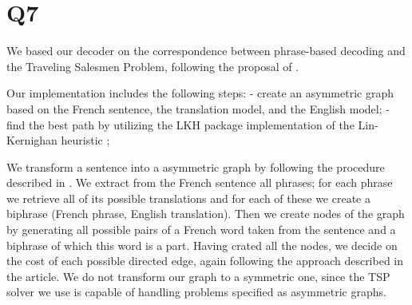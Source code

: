 \documentclass[11pt]{article}
\begin{document}
\section*{Q7}
We based our decoder on the correspondence between phrase-based decoding and the Traveling Salesmen Problem, following the proposal of \cite{zaslavskiy2009}.

Our implementation includes the following steps:
- create an asymmetric graph based on the French sentence, the translation model, and the English model;
- find the best path by utilizing the LKH package implementation of the Lin-Kernighan heuristic \cite{Helsgaun2006};

We transform a sentence into a asymmetric graph by following the procedure described in \cite{zaslavskiy2009}. We extract from the French sentence all phrases; for each phrase we retrieve all of its possible translations and for each of these we create a biphrase (French phrase, English translation). Then we create nodes of the graph by generating all possible pairs of a French word taken from the sentence and a biphrase of which this word is a part. Having crated all the nodes, we decide on the cost of each possible directed edge, again following the approach described in the article. We do not transform our graph to a symmetric one, since the TSP solver we use is capable of handling problems specified as asymmetric graphs.
\end{document}
